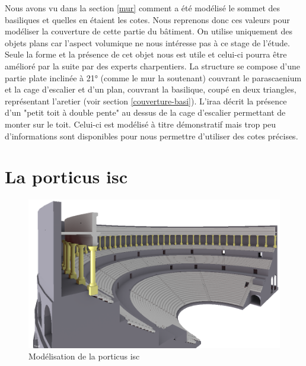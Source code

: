 Nous avons vu dans la section \ref{mur} comment a été modélisé le sommet des \glspl{basilique} et quelles en étaient les cotes. Nous reprenons donc ces valeurs pour modéliser la couverture de cette partie du bâtiment. On utilise uniquement des objets plans car l'aspect volumique ne nous intéresse pas à ce stage de l'étude. Seule la forme et la présence de cet objet nous est utile et celui-ci pourra être amélioré par la suite par des experts charpentiers. La structure se compose d'une partie plate inclinée à 21° (comme le mur la soutenant) couvrant le \gls{parascaenium} et la cage d'escalier et d'un plan, couvrant la \gls{basilique}, coupé en deux triangles, représentant l'\gls{aretier} (voir section \ref{couverture-basi}). L'\gls{iraa} décrit la présence d'un "petit toit à double pente" \cite[p. 34]{orangeTxt} au dessus de la cage d'escalier permettant de monter sur le toit. Celui-ci est modélisé à titre démonstratif mais trop peu d'informations sont disponibles pour nous permettre d'utiliser des cotes précises.


\section{La \gls{porticus isc}}

\begin{figure}[!h]
	\includegraphics[width=\linewidth]{images/modPorticus}
	\caption{Modélisation de la \gls{porticus isc}} 
	\label{modPorticus} 
\end{figure} 

